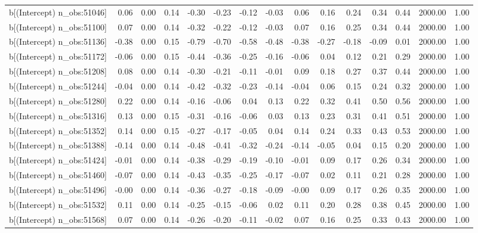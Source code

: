 \begin{table}[ht]
\begin{tabular}{rrrrrrrrrrrrrrr}
  b[(Intercept) n\_obs:51046] & 0.06 & 0.00 & 0.14 & -0.30 & -0.23 & -0.12 & -0.03 & 0.06 & 0.16 & 0.24 & 0.34 & 0.44 & 2000.00 & 1.00 \\ 
  b[(Intercept) n\_obs:51100] & 0.07 & 0.00 & 0.14 & -0.32 & -0.22 & -0.12 & -0.03 & 0.07 & 0.16 & 0.25 & 0.34 & 0.44 & 2000.00 & 1.00 \\ 
  b[(Intercept) n\_obs:51136] & -0.38 & 0.00 & 0.15 & -0.79 & -0.70 & -0.58 & -0.48 & -0.38 & -0.27 & -0.18 & -0.09 & 0.01 & 2000.00 & 1.00 \\ 
  b[(Intercept) n\_obs:51172] & -0.06 & 0.00 & 0.15 & -0.44 & -0.36 & -0.25 & -0.16 & -0.06 & 0.04 & 0.12 & 0.21 & 0.29 & 2000.00 & 1.00 \\ 
  b[(Intercept) n\_obs:51208] & 0.08 & 0.00 & 0.14 & -0.30 & -0.21 & -0.11 & -0.01 & 0.09 & 0.18 & 0.27 & 0.37 & 0.44 & 2000.00 & 1.00 \\ 
  b[(Intercept) n\_obs:51244] & -0.04 & 0.00 & 0.14 & -0.42 & -0.32 & -0.23 & -0.14 & -0.04 & 0.06 & 0.15 & 0.24 & 0.32 & 2000.00 & 1.00 \\ 
  b[(Intercept) n\_obs:51280] & 0.22 & 0.00 & 0.14 & -0.16 & -0.06 & 0.04 & 0.13 & 0.22 & 0.32 & 0.41 & 0.50 & 0.56 & 2000.00 & 1.00 \\ 
  b[(Intercept) n\_obs:51316] & 0.13 & 0.00 & 0.15 & -0.31 & -0.16 & -0.06 & 0.03 & 0.13 & 0.23 & 0.31 & 0.41 & 0.51 & 2000.00 & 1.00 \\ 
  b[(Intercept) n\_obs:51352] & 0.14 & 0.00 & 0.15 & -0.27 & -0.17 & -0.05 & 0.04 & 0.14 & 0.24 & 0.33 & 0.43 & 0.53 & 2000.00 & 1.00 \\ 
  b[(Intercept) n\_obs:51388] & -0.14 & 0.00 & 0.14 & -0.48 & -0.41 & -0.32 & -0.24 & -0.14 & -0.05 & 0.04 & 0.15 & 0.20 & 2000.00 & 1.00 \\ 
  b[(Intercept) n\_obs:51424] & -0.01 & 0.00 & 0.14 & -0.38 & -0.29 & -0.19 & -0.10 & -0.01 & 0.09 & 0.17 & 0.26 & 0.34 & 2000.00 & 1.00 \\ 
  b[(Intercept) n\_obs:51460] & -0.07 & 0.00 & 0.14 & -0.43 & -0.35 & -0.25 & -0.17 & -0.07 & 0.02 & 0.11 & 0.21 & 0.28 & 2000.00 & 1.00 \\ 
  b[(Intercept) n\_obs:51496] & -0.00 & 0.00 & 0.14 & -0.36 & -0.27 & -0.18 & -0.09 & -0.00 & 0.09 & 0.17 & 0.26 & 0.35 & 2000.00 & 1.00 \\ 
  b[(Intercept) n\_obs:51532] & 0.11 & 0.00 & 0.14 & -0.25 & -0.15 & -0.06 & 0.02 & 0.11 & 0.20 & 0.28 & 0.38 & 0.45 & 2000.00 & 1.00 \\ 
  b[(Intercept) n\_obs:51568] & 0.07 & 0.00 & 0.14 & -0.26 & -0.20 & -0.11 & -0.02 & 0.07 & 0.16 & 0.25 & 0.33 & 0.43 & 2000.00 & 1.00 \\ 

\end{tabular}
\end{table}

